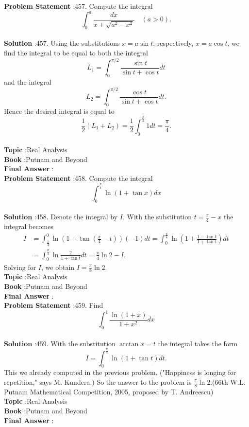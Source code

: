 \documentclass[10pt]{article}
\begin{document}
\textbf{Problem Statement} :457. Compute the integral$$ \int_{0}^{a} \frac{d x}{x+\sqrt{a^{2}-x^{2}}} \quad(a>0) . $$\\
\textbf{Solution} :457. Using the substitutions $x=a \sin t$, respectively, $x=a \cos t$, we find the integral to be equal to both the integral$$ L_{1}=\int_{0}^{\pi / 2} \frac{\sin t}{\sin t+\cos t} d t $$and the integral$$ L_{2}=\int_{0}^{\pi / 2} \frac{\cos t}{\sin t+\cos t} d t . $$Hence the desired integral is equal to$$ \frac{1}{2}\left(L_{1}+L_{2}\right)=\frac{1}{2} \int_{0}^{\frac{\pi}{2}} 1 d t=\frac{\pi}{4} . $$\\
\textbf{Topic} :Real Analysis\\
\textbf{Book} :Putnam and Beyond\\
\textbf{Final Answer} :\\


\textbf{Problem Statement} :458. Compute the integral$$ \int_{0}^{\frac{\pi}{4}} \ln (1+\tan x) d x $$\\
\textbf{Solution} :458. Denote the integral by $I$. With the substitution $t=\frac{\pi}{4}-x$ the integral becomes$$ \begin{aligned} I &=\int_{\frac{\pi}{4}}^{0} \ln \left(1+\tan \left(\frac{\pi}{4}-t\right)\right)(-1) d t=\int_{0}^{\frac{\pi}{4}} \ln \left(1+\frac{1-\tan t}{1+\tan t}\right) d t \\ &=\int_{0}^{\frac{\pi}{4}} \ln \frac{2}{1+\tan t} d t=\frac{\pi}{4} \ln 2-I . \end{aligned} $$Solving for $I$, we obtain $I=\frac{\pi}{8} \ln 2$.\\
\textbf{Topic} :Real Analysis\\
\textbf{Book} :Putnam and Beyond\\
\textbf{Final Answer} :\\


\textbf{Problem Statement} :459. Find$$ \int_{0}^{1} \frac{\ln (1+x)}{1+x^{2}} d x $$\\
\textbf{Solution} :459. With the substitution $\arctan x=t$ the integral takes the form$$ I=\int_{0}^{\frac{\pi}{4}} \ln (1+\tan t) d t . $$This we already computed in the previous problem. ("Happiness is longing for repetition," says M. Kundera.) So the answer to the problem is $\frac{\pi}{8} \ln 2$.(66th W.L. Putnam Mathematical Competition, 2005, proposed by T. Andreescu)\\
\textbf{Topic} :Real Analysis\\
\textbf{Book} :Putnam and Beyond\\
\textbf{Final Answer} :\\
\end{document}
